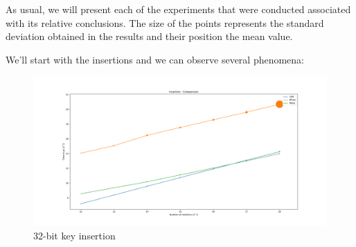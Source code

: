 As usual, we will present each of the experiments that were conducted associated with its relative conclusions. The size of the points represents the standard deviation obtained in the results and their position the mean value.

We'll start with the insertions and we can observe several phenomena:

\begin{figure}[!htb]
    \centering
    \includegraphics[width=\linewidth]{Chapters/ParallelXFastTries/Insertions.png} 
    \caption{32-bit key insertion}
\end{figure}

